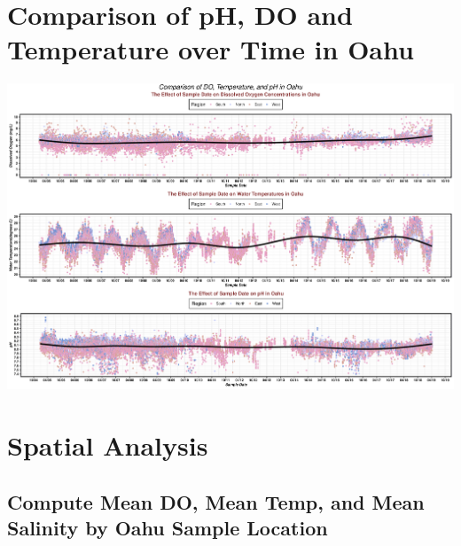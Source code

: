 \documentclass[12pt,]{article}
\newenvironment{Shaded}{\begin{snugshade}}{\end{snugshade}}
\newcommand{\KeywordTok}[1]{\textcolor[rgb]{0.13,0.29,0.53}{\textbf{#1}}}
\newcommand{\DataTypeTok}[1]{\textcolor[rgb]{0.13,0.29,0.53}{#1}}
\newcommand{\StringTok}[1]{\textcolor[rgb]{0.31,0.60,0.02}{#1}}
\newcommand{\OperatorTok}[1]{\textcolor[rgb]{0.81,0.36,0.00}{\textbf{#1}}}
\newcommand{\NormalTok}[1]{#1}
\begin{document}
\section{Comparison of pH, DO and Temperature over Time in
Oahu}\label{comparison-of-ph-do-and-temperature-over-time-in-oahu}

\includegraphics{Garcia_ENV872_Project_files/figure-latex/unnamed-chunk-98-1.pdf}

\section{Spatial Analysis}\label{spatial-analysis}

\subsection{Compute Mean DO, Mean Temp, and Mean Salinity by Oahu Sample
Location}\label{compute-mean-do-mean-temp-and-mean-salinity-by-oahu-sample-location}

\begin{Shaded}
\end{Shaded}
\end{document}
